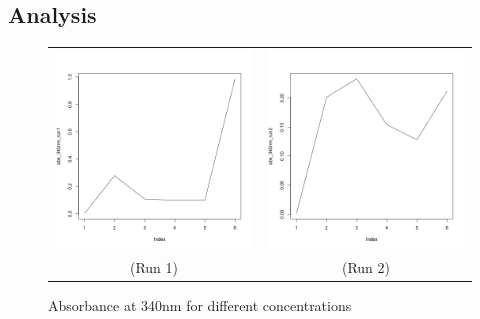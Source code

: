 \documentclass[a4paper,11pt]{article}
\begin{document}
        \subsection*{Analysis}
            \begin{figure}[H]
                \centering
                \begin{tabular}{cc}
                    \includegraphics[width=200px]{../resources/absorption_r1_340.png} &
                    \includegraphics[width=200px]{../resources/absorption_r2_340.png} \\
                    (Run 1) & (Run 2)\\
                \end{tabular}
                \caption{Absorbance at 340nm for different concentrations}
                \label{fig:abs_340}
            \end{figure}
    \pagebreak
\end{document}
